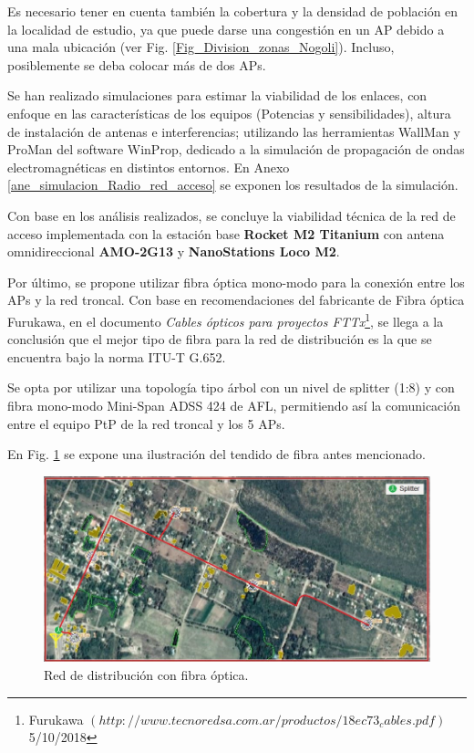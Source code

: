 \documentclass[12pt,a4paper]{book}
\begin{document}
Es necesario tener en cuenta también la cobertura y la densidad de población en la localidad de estudio, ya que puede darse una congestión en un AP debido a una mala ubicación (ver Fig. \ref{Fig_Division_zonas_Nogoli}). Incluso, posiblemente se deba colocar más de dos APs. 

\medskip 
Se han realizado simulaciones para estimar la viabilidad de los enlaces, con enfoque en las características de los equipos (Potencias y sensibilidades), altura de instalación de antenas e interferencias; utilizando las herramientas WallMan y ProMan del software WinProp, dedicado a la simulación de propagación de ondas electromagnéticas en distintos entornos. En Anexo \ref{ane_simulacion_Radio_red_acceso} se exponen los resultados de la simulación. 

\medskip


Con base en los análisis realizados, se concluye la viabilidad técnica de la red de acceso implementada con la estación base \textbf{Rocket M2 Titanium} con antena omnidireccional \textbf{AMO-2G13} y \textbf{NanoStations Loco M2}. \medskip

Por último, se propone utilizar fibra óptica mono-modo para la conexión entre los APs y la red troncal. Con base en recomendaciones del fabricante de Fibra óptica Furukawa, en el documento \emph{Cables ópticos para proyectos FTTx}\footnote{Furukawa $(http://www.tecnoredsa.com.ar/productos/18ec73_cables.pdf)$ 5/10/2018}, se llega a la conclusión que el mejor tipo de fibra para la red de distribución es la que se encuentra bajo la norma ITU-T G.652. \medskip

Se opta por utilizar una topología tipo árbol con un nivel de splitter (1:8) y con fibra mono-modo Mini-Span ADSS 424 de AFL, permitiendo así la comunicación entre el equipo PtP de la red troncal y los 5 APs.

\medskip

En Fig. \ref{fig_redDistribucion_acceso} se expone una ilustración del tendido de fibra antes mencionado.

\medskip

\begin{figure} [H]
\centering
\includegraphics[width= 15cm]{../figuras/tendido_fibra_distribucion.JPG}

\caption{Red de distribución con fibra óptica.}
\label{fig_redDistribucion_acceso}
\end{figure}
\end{document}
